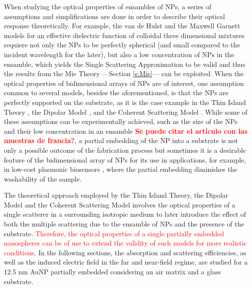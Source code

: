 
When studying the optical properties of ensambles of NPs, a series of assumptions and simplifications are done in order to describe their optical response theoretically. For example, the van de Hulst  \cite{hulst_light_1981} and the Maxwell Garnett \cite{sihvola_electromagnetic_2008} models for an effective dielectric function of colloidal three dimensional mixtures requiere not only the NPs to be perfectly spherical (and small compared to the incident wavelength for the later), but also a low concentration of NPs in the ensamble, which yields the Single Scattering Approximation to be valid and thus the results from the Mie Theory ---Section \ref{s:Mie}--- can be exploited. When the optical properties of bidimensional arrays of NPs are of interest, one assumption common to several models, besides the aforementioned, is that the NPs are  perfectly supported on the substrate, as it is the case example in the Thin Island Theory \cite{bedeaux_optical_2004}, the Dipolar Model \cite{barrera1991optical}, and the Coherent Scattering Model \cite{garcia2012multiple}. While some of these assumptions can be experimentally achieved, such as the size of the NPs and their low concentration in an ensamble \textcolor{red}{\textbf{Se puede citar el artículo con las muestras de francia?}}, a partial embedding of the NP into a substrate is not only a possible outcome of the fabrication process \cite{meng_anisotropic_2015} but sometimes it is a desirable feature of the bidimensional array of NPs for its use in applications, for example, in low-cost plasmonic biosensors \cite{moirangthem_enhanced_2012}, where the partial embedding diminishes the washability of the sample.

The theoretical approach employed by the Thin Island Theory, the Dipolar Model and the Coherent Scattering Model involves the optical properties of a single scatterer in a surrounding isotropic medium to later introduce the effect of both the multiple scattering due to the ensamble of NPs and the presence of the substrate. \textcolor{red}{Therefore, the optical properties of a single partially embedded nanospheres can be of use to extend the validity  of such models for more realistic conditions}. In the following sections, the absorption and scattering efficiencies, as well as the induced electric field in the far and near-field regime, are studied for a 12.5 nm AuNP partially embedded considering an air matrix and a glass substrate.
